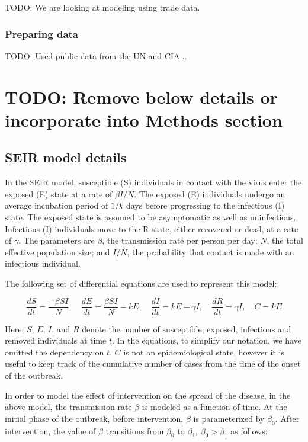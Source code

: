 \documentclass[10pt, journal,onecolumn]{IEEEtran}
\begin{document}
TODO: We are looking at modeling using trade data.

\subsubsection{Preparing data}

TODO: Used public data from the UN and CIA...



%
%
\section{TODO: Remove below details or incorporate into Methods section}


\subsection{SEIR model details}

In the SEIR model, susceptible (S) individuals in contact with the virus enter the exposed (E) state
at a rate of $\beta I / N$.
The exposed (E) individuals undergo an average incubation period of $1/k$ days before progressing to
the infectious (I) state. The exposed state is assumed to be asymptomatic as well as uninfectious.
Infectious (I) individuals move to the R state, either recovered or dead, at a rate of $\gamma$.
 The parameters are $\beta$, the transmission rate per person per day;
$N$, the total effective population size; and $I/N$, the probability that contact is made with
an infectious individual.

The following set of differential equations are used to represent this model:

$$
\dfrac{dS}{dt}	=	\dfrac{-\beta SI}{N}\nonumber,
\quad
\dfrac{dE}{dt}	=	\dfrac{\beta SI}{N}-kE\nonumber,
\quad
\dfrac{dI}{dt}	=	kE-\gamma I\nonumber,
\quad
\dfrac{dR}{dt}	=	\gamma I\nonumber,
\quad
             C	=	kE\nonumber
$$

Here, $S$, $E$, $I$, and $R$ denote the number of susceptible, exposed, infectious and removed
individuals at time $t$. In the equations, to simplify our notation, we have omitted the dependency
on $t$. $C$ is not an epidemiological state, however it is useful to keep track of the cumulative
number of cases from the time of the onset of the outbreak.

In order to model the effect of intervention on the spread of the disease, in the above model, the
transmission rate $\beta$ is modeled as a function of time. At the initial phase of the outbreak,
before intervention, $\beta$ is parameterized by $\beta_0$. After intervention, the value of
$\beta$ transitions from $\beta_0$ to $\beta_1$, $\beta_0>\beta_1$ as follows:
\end{document}
